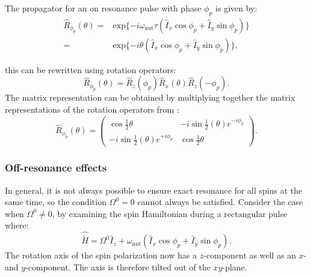 The propagator for an on resonance pulse with phase $\phi_p$ is given by:
\begin{align}
  \hat{R}_{\phi_p}(\theta) =& \text{exp}\{-i\omega_{\text{nut}}\tau(\hat{I}_x\cos\phi_p + \hat{I}_y\sin\phi_p)\}\\
  =& \text{exp}\{-i\theta(\hat{I}_x\cos\phi_p + \hat{I}_y\sin\phi_p)\},
\end{align}

this can be rewritten using rotation operators:
\begin{equation}
  \hat{R}_{\phi_p}(\theta) = \hat{R}_z(\phi_p)\hat{R}_x(\theta)\hat{R}_z(-\phi_p).
\end{equation}
The matrix representation can be obtained by multiplying together the matrix
representations of the rotation operators from :
\begin{equation}
  \hat{R}_{\phi_p}(\theta) = \begin{pmatrix}
    \cos\frac{1}{2}\theta & -i\sin\frac{1}{2}(\theta)e^{-i\phi_p}\\
    -i\sin\frac{1}{2}(\theta)e^{+i\phi_p} & \cos\frac{1}{2}\theta
\end{pmatrix}.
\end{equation}

\subsubsection{Off-resonance effects}

In general, it is not always possible to ensure exact resonance for all spins at the same
time, so the condition $\Omega^0 = 0$ cannot always be satisfied. Consider the
case when $\Omega^0 \neq 0$, by examining the spin Hamiltonian during a rectangular
pulse where:
\begin{equation}
  \hat{\tilde{H}} = \Omega^0\hat{I}_z + \omega_{\text{nut}}(\hat{I}_x\cos\phi_p + \hat{I}_y\sin\phi_p).
\end{equation}
The rotation axis of the spin polarization now has a $z$-component as well as an $x$- and $y$-component. The
axis is therefore tilted out of the $xy$-plane.

